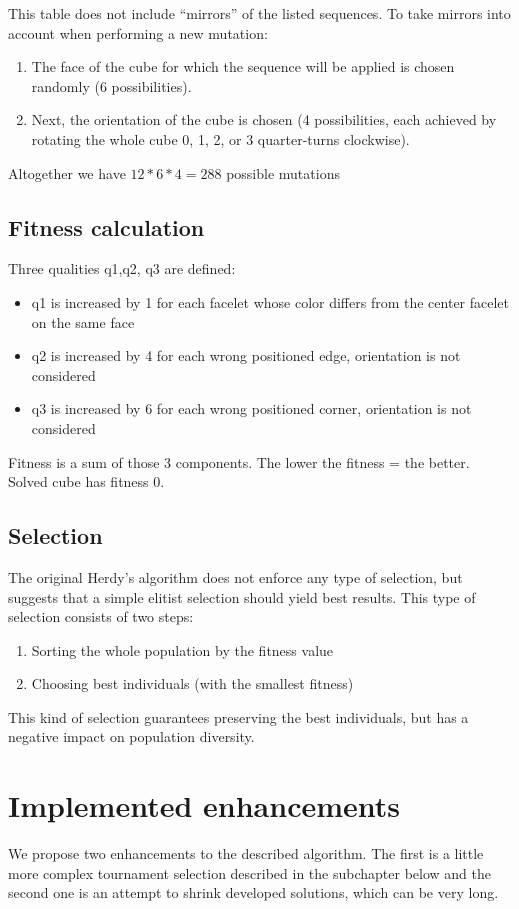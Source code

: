 \documentclass[a4paper]{article}
\begin{document}
This table does not include “mirrors” of the listed sequences.
To take mirrors into account when performing a new mutation:
\begin{enumerate}
\item The face of the cube for which the sequence will be applied is chosen randomly (6 possibilities).
\item Next, the orientation of the cube is chosen (4 possibilities, each achieved by rotating the whole cube 0, 1, 2, or 3 quarter-turns clockwise).
\end{enumerate}
Altogether we have \(12*6*4 = 288\) possible mutations

\subsection{Fitness calculation}
Three qualities q1,q2, q3 are defined:
\begin{itemize}
\item q1 is increased by 1 for each facelet whose color differs from the center facelet on the same face
\item q2 is increased by 4 for each wrong positioned edge, orientation is not considered
\item q3 is increased by 6 for each wrong positioned corner, orientation is not considered
\end{itemize}
Fitness is a sum of those 3 components. The lower the fitness = the better. Solved cube has fitness 0.

\subsection{Selection}
The original Herdy’s algorithm does not enforce any type of selection, but suggests that a simple elitist selection should yield best results. This type of selection consists of two steps:

\begin{enumerate}
\item Sorting the whole population by the fitness value
\item Choosing  best individuals (with the smallest fitness)
\end{enumerate}

This kind of selection guarantees preserving the best individuals, but has a negative impact on population diversity.

\section{Implemented enhancements}
We propose two enhancements to the described algorithm. The first is a little more complex tournament selection described in the subchapter below and the second one is an attempt to shrink developed solutions, which can be very long.
\end{document}
